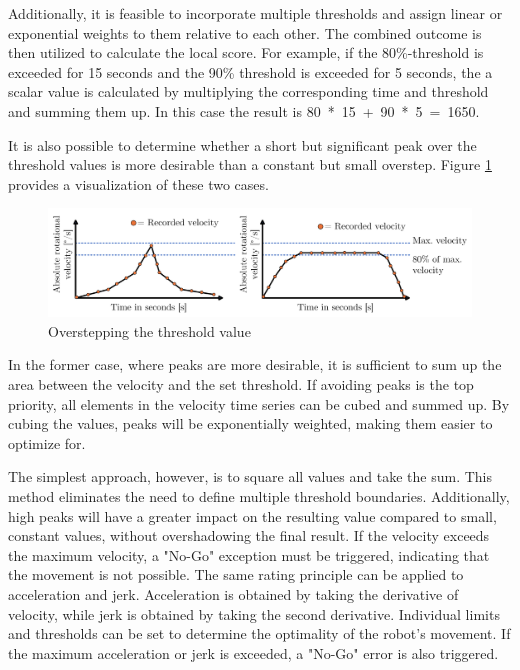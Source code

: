 Additionally, it is feasible to incorporate multiple thresholds and assign linear or exponential weights to them relative to each other. The combined outcome is then utilized to calculate the local score. For example, if the 80\%-threshold is exceeded for 15 seconds and the 90\% threshold is exceeded for 5 seconds, the a scalar value is calculated by multiplying the corresponding time and threshold and summing them up. In this case the result is 80~*~15~+~90~*~5~=~1650.

It is also possible to determine whether a short but significant peak over the threshold values is more desirable than a constant but small overstep. Figure \ref{peaklong} provides a visualization of these two cases.

\begin{figure}[H]
	\centerline{\includegraphics[width=1\textwidth]{figures/peaklong.png}}
	\caption{Overstepping the threshold value}
	\label{peaklong}
\end{figure}
\newpage
In the former case, where peaks are more desirable, it is sufficient to sum up the area between the velocity and the set threshold. If avoiding peaks is the top priority, all elements in the velocity time series can be cubed and summed up. By cubing the values, peaks will be exponentially weighted, making them easier to optimize for.


The simplest approach, however, is to square all values and take the sum. This method eliminates the need to define multiple threshold boundaries. Additionally, high peaks will have a greater impact on the resulting value compared to small, constant values, without overshadowing the final result. If the velocity exceeds the maximum velocity, a "No-Go" exception must be triggered, indicating that the movement is not possible. The same rating principle can be applied to acceleration and jerk. Acceleration is obtained by taking the derivative of velocity, while jerk is obtained by taking the second derivative. Individual limits and thresholds can be set to determine the optimality of the robot's movement. If the maximum acceleration or jerk is exceeded, a "No-Go" error is also triggered.

